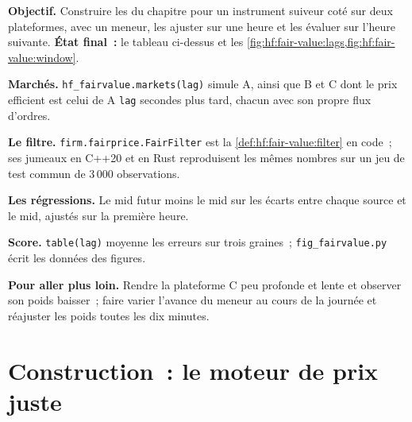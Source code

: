 \begin{tutorial}
\textbf{Objectif.} Construire les  du chapitre pour un instrument suiveur coté sur deux plateformes, avec un meneur, les ajuster sur une heure et les évaluer
sur l'heure suivante. \textbf{État final~:} le tableau ci-dessus et les \cref{fig:hf:fair-value:lags,fig:hf:fair-value:window}.
\begin{tutsteps}
\item \textbf{Marchés.} \texttt{hf\_fairvalue.markets(lag)} simule A, ainsi que B et C dont le prix efficient est celui de A \texttt{lag} secondes plus tard,
chacun avec son propre flux d'ordres.
\item \textbf{Le filtre.} \texttt{firm.fairprice.FairFilter} est la \cref{def:hf:fair-value:filter} en code~; ses jumeaux en C++20 et en Rust reproduisent les
mêmes nombres sur un jeu de test commun de 3\,000 observations.
\label{lst:hf:fair-value:filter}
\item \textbf{Les régressions.} Le mid futur moins le mid sur les écarts entre chaque source et le mid, ajustés sur la première heure.
\label{lst:hf:fair-value:weights}
\item \textbf{Score.} \texttt{table(lag)} moyenne les erreurs sur trois graines~; \texttt{fig\_fairvalue.py} écrit les données des figures.
\end{tutsteps}
\textbf{Pour aller plus loin.} Rendre la plateforme C peu profonde et lente et observer son poids baisser~; faire varier l'avance du meneur au cours de la journée et réajuster les poids
toutes les dix minutes.
\end{tutorial}

\section{Construction~: le moteur de prix juste}\label{bld:hf:fair-value:fairprice}

